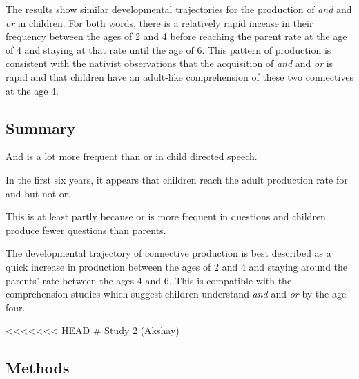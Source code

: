 \documentclass[10pt, letterpaper]{article}
\begin{document}
The results show similar developmental trajectories for the production
of \emph{and} and \emph{or} in children. For both words, there is a
relatively rapid incease in their frequency between the ages of 2 and 4
before reaching the parent rate at the age of 4 and staying at that rate
until the age of 6. This pattern of production is consistent with the
nativist observations that the acquisition of \emph{and} and \emph{or}
is rapid and that children have an adult-like comprehension of these two
connectives at the age 4.

\subsection{Summary}\label{summary}

And is a lot more frequent than or in child directed speech.

In the first six years, it appears that children reach the adult
production rate for and but not or.

This is at least partly because or is more frequent in questions and
children produce fewer questions than parents.

The developmental trajectory of connective production is best described
as a quick increase in production between the ages of 2 and 4 and
staying around the parents' rate between the ages 4 and 6. This is
compatible with the comprehension studies which suggest children
understand \emph{and} and \emph{or} by the age four.

\textless{}\textless{}\textless{}\textless{}\textless{}\textless{}\textless{}
HEAD \# Study 2 (Akshay)

\subsection{Methods}\label{methods-1}
\end{document}
